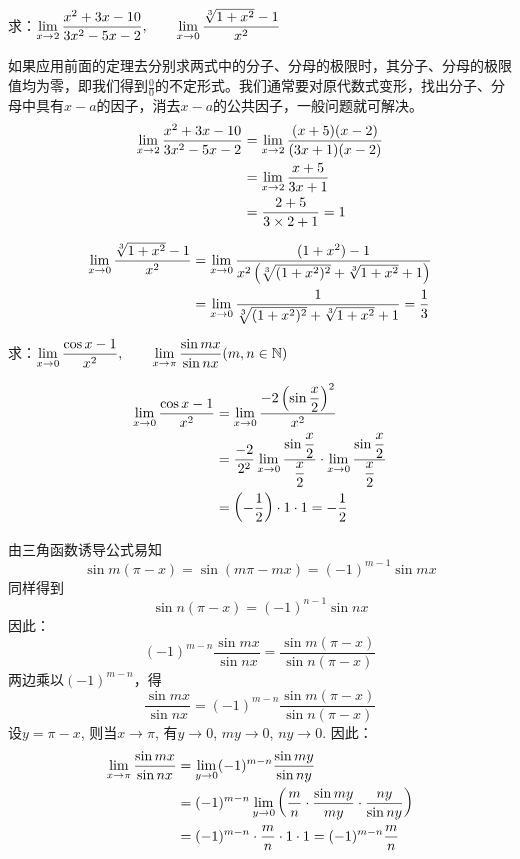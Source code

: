 \begin{example}
求：$\displaystyle\lim_{x\to 2}\dfrac{x^2+3x-10}{3x^2-5x-2},\qquad \displaystyle\lim_{x\to 0}\dfrac{\sqrt[3]{1+x^2}-1}{x^2}$
\end{example}

\begin{solution}
    如果应用前面的定理去分别求两式中的分子、分母的极限时，其分子、分母的极限值均为零，即我们得到$\frac{0}{0}$的不定形式。我们通常要对原代数式变形，找出分子、分母中具有$x-a$的因子，消去$x-a$的公共因子，一般问题就可解决。
\[\begin{split}
    \displaystyle\lim_{x\to 2}\dfrac{x^2+3x-10}{3x^2-5x-2}&=\displaystyle\lim_{x\to 2}\dfrac{(x+5)(x-2)}{(3x+1)(x-2)}\\
    &=\displaystyle\lim_{x\to 2}\dfrac{x+5}{3x+1}\\
    &=\dfrac{2+5}{3\times 2+1}=1
\end{split}\]

\[\begin{split}
    \displaystyle\lim_{x\to 0}\dfrac{\sqrt[3]{1+x^2}-1}{x^2}&=\displaystyle\lim_{x\to 0}\dfrac{{(1+x^2)}-1}{x^2\left(\sqrt[3]{(1+x^2)^2}+\sqrt[3]{1+x^2}+1\right)}\\
    &=\displaystyle\lim_{x\to 0}\dfrac{1}{\sqrt[3]{(1+x^2)^2}+\sqrt[3]{1+x^2}+1}=\dfrac{1}{3}
\end{split}\]
\end{solution}

\begin{example}
    求：$\displaystyle\lim_{x\to 0}\dfrac{\cos x-1}{x^2},\qquad \displaystyle\lim_{x\to \pi}\dfrac{\sin mx}{\sin nx}(m,n\in \mathbb{N})$
\end{example}

\begin{solution}
\[\begin{split}
    \displaystyle\lim_{x\to 0}\dfrac{\cos x-1}{x^2}&=\displaystyle\lim_{x\to 0}\dfrac{-2\left(\sin\dfrac{x}{2}\right)^2}{x^2}\\
    &=\dfrac{-2}{2^2}\displaystyle\lim_{x\to 0}\dfrac{\sin\dfrac{x}{2}}{\dfrac{x}{2}}\cdot \displaystyle\lim_{x\to 0}\dfrac{\sin\dfrac{x}{2}}{\dfrac{x}{2}}\\
    &=\left(-\dfrac{1}{2}\right)\cdot 1\cdot 1=-\dfrac{1}{2}
\end{split}\]

由三角函数诱导公式易知
\[\sin m(\pi-x)=\sin(m\pi-mx)=(-1)^{m-1}\sin mx\]
同样得到
\[\sin n(\pi-x)=(-1)^{n-1}\sin nx\]
因此：
\[(-1)^{m-n}\frac{\sin mx}{\sin nx}=\frac{\sin m(\pi-x)}{\sin n(\pi-x)}\]
两边乘以$(-1)^{m-n}$，得
\[\frac{\sin mx}{\sin nx}=(-1)^{m-n}\frac{\sin m(\pi-x)}{\sin n(\pi-x)}\]
设$y=\pi-x$, 则当$x\to \pi$, 有$y\to 0$, $my\to 0$, $ny\to 0$. 因此：
\[\begin{split}
    \displaystyle\lim_{x\to \pi}\dfrac{\sin mx}{\sin nx}&=\lim_{y\to 0}(-1)^{m-n}\dfrac{\sin my}{\sin ny}\\
&=(-1)^{m-n}\lim_{y\to 0}\left(\dfrac{m}{n}\cdot \dfrac{\sin my}{my}\cdot \dfrac{ny}{\sin ny}\right)\\
&=(-1)^{m-n}\cdot \dfrac{m}{n}\cdot 1\cdot 1=(-1)^{m-n}\dfrac{m}{n}
\end{split}\]
\end{solution}


